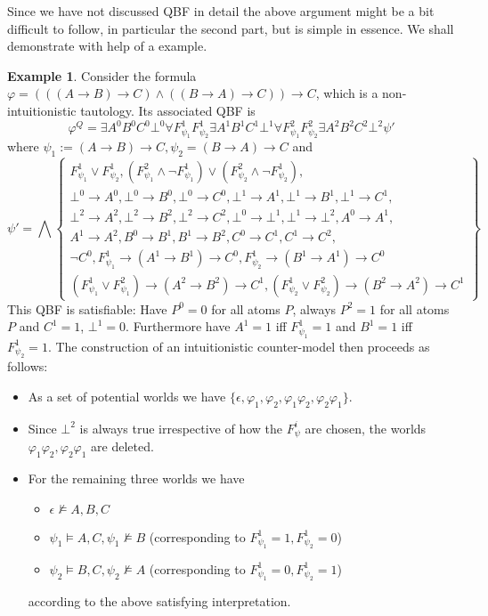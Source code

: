 \documentclass[a4paper,12pt]{report}
\theoremstyle{definition}
\theoremstyle{definition}
\theoremstyle{definition}
\theoremstyle{definition}
\theoremstyle{definition}
\theoremstyle{definition}
\newtheorem{example}[theorem]{Example}
\theoremstyle{definition}
\begin{document}
	Since we have not discussed QBF in detail the above argument might be a bit difficult to follow, in particular the second part, but is simple in essence. We shall demonstrate with help of a example.

	\begin{example}
		Consider the formula $\varphi = (((A\to B)\to C)\wedge((B\to A)\to C))\to C$, which is a non-intuitionistic tautology. Its associated QBF is $$\varphi^Q = \exists A^0B^0C^0\bot^0\forall F_{\psi_1}^1F_{\psi_2}^1 \exists A^1B^1C^1\bot^1\forall F_{\psi_1}^2F_{\psi_2}^2 \exists A^2B^2C^2\bot^2\psi'$$where $\psi_1 := (A\to B)\to C, \psi_2 = (B\to A)\to C$ and $$\psi' = \bigwedge\left\{\begin{matrix}
			F^1_{\psi_1}\vee F^1_{\psi_2}, (F^2_{\psi_1}\wedge\neg F^1_{\psi_1})\vee (F^2_{\psi_2}\wedge\neg F^1_{\psi_2}),\\\bot^0\to A^0, \bot^0\to B^0,\bot^0\to C^0,\bot^1\to A^1,\bot^1\to B^1, \bot^1\to C^1,\\
			\bot^2\to A^2, \bot^2\to B^2,\bot^2\to C^2,\bot^0\to \bot^1, \bot^1\to\bot^2, A^0\to A^1,
			\\A^1\to A^2, B^0\to B^1, B^1\to B^2, C^0\to C^1, C^1\to C^2,\\
			  \neg C^0, F^1_{\psi_1}\to (A^1\to B^1)\to C^0, F^1_{\psi_2}\to(B^1\to A^1)\to C^0\\
			 (F^1_{\psi_1}\vee F^2_{\psi_1})\to (A^2\to B^2)\to C^1, (F^1_{\psi_2}\vee F^2_{\psi_2})\to(B^2\to A^2)\to C^1
		\end{matrix}\right\}$$
	This QBF is satisfiable: Have $P^0 = 0$ for all atoms $P$, always $P^2 = 1$ for all atoms $P$ and $C^1 = 1$, $\bot^1 = 0$. Furthermore have $A^1 = 1$ iff $F^1_{\psi_1} = 1$ and $B^1 = 1$ iff $F^1_{\psi_2} = 1$. The construction of an intuitionistic counter-model then proceeds as follows:
	\begin{itemize}
		\item As a set of potential worlds we have $\{\epsilon, \varphi_1, \varphi_2, \varphi_1\varphi_2, \varphi_2\varphi_1\}$.
		\item Since $\bot^2$ is always true irrespective of how the $F^i_\psi$ are chosen, the worlds $\varphi_1\varphi_2, \varphi_2\varphi_1$ are deleted.
		\item For the remaining three worlds we have
		\begin{itemize}
			\item$\epsilon\not\models A, B, C$
			\item$\psi_1\models A, C, \psi_1\not\models B$ (corresponding to $F^1_{\psi_1} = 1, F^1_{\psi_2} = 0$)
			\item$\psi_2\models B, C, \psi_2\not\models A$ (corresponding to $F^1_{\psi_1} = 0, F^1_{\psi_2} = 1$)
		\end{itemize}
		according to the above satisfying interpretation.
	\end{itemize}
	\end{example}	
\end{document}
